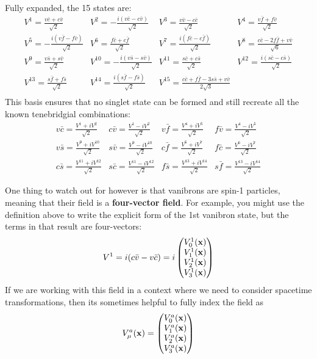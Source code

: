 Fully expanded, the 15 states are:
\[
  \begin{array}{cccc}
    V^1=\frac{v \bar{c}+c \bar{v}}{\sqrt{2}}                 & V^2=-\frac{i \left(v \bar{c}-c \bar{v}\right)}{\sqrt{2}}    & V^3=\frac{v \bar{v}-c \bar{c}}{\sqrt{2}}                            & V^4=\frac{v \bar{f}+f \bar{v}}{\sqrt{2}}                   \\
    V^5=-\frac{i \left(v \bar{f}-f \bar{v}\right)}{\sqrt{2}} & V^6=\frac{f \bar{c}+c \bar{f}}{\sqrt{2}}                    & V^7=\frac{i \left(f \bar{c}-c \bar{f}\right)}{\sqrt{2}}             & V^8=\frac{c \bar{c}-2 f \bar{f}+v \bar{v}}{\sqrt{6}}       \\
    V^9=\frac{v \bar{s}+s \bar{v}}{\sqrt{2}}                 & V^{10}=-\frac{i \left(v \bar{s}-s \bar{v}\right)}{\sqrt{2}} & V^{11}=\frac{s \bar{c}+c \bar{s}}{\sqrt{2}}                         & V^{12}=\frac{i \left(s \bar{c}-c \bar{s}\right)}{\sqrt{2}} \\
    V^{13}=\frac{s \bar{f}+f \bar{s}}{\sqrt{2}}              & V^{14}=\frac{i \left(s \bar{f}-f \bar{s}\right)}{\sqrt{2}}  & V^{15}=\frac{c \bar{c}+f \bar{f}-3 s \bar{s}+v \bar{v}}{2 \sqrt{3}} & \text{}                                                    \\
  \end{array}
\]
This basis ensures that no singlet state can be formed and still recreate all the known tenebridgial combinations:
\[
  \begin{array}{cccc}
    v\bar{c} = \frac{V^1+iV^2}{\sqrt{2}}
     & c\bar{v} = \frac{V^1-iV^2}{\sqrt{2}}
     & v\bar{f} = \frac{V^4+iV^5}{\sqrt{2}}
     & f\bar{v} = \frac{V^4-iV^5}{\sqrt{2}}       \\
    v\bar{s} = \frac{V^9+iV^{10}}{\sqrt{2}}
     & s\bar{v} = \frac{V^{9}-iV^{10}}{\sqrt{2}}
     & c\bar{f} = \frac{V^{6}+iV^{7}}{\sqrt{2}}
     & f\bar{c} = \frac{V^{6}-iV^{7}}{\sqrt{2}}   \\
    c\bar{s} = \frac{V^{11}+iV^{12}}{\sqrt{2}}
     & s\bar{c} = \frac{V^{11}-iV^{12}}{\sqrt{2}}
     & f\bar{s} = \frac{V^{13}+iV^{14}}{\sqrt{2}}
     & s\bar{f} = \frac{V^{13}-iV^{14}}{\sqrt{2}}
  \end{array}
\]

One thing to watch out for however is that vanibrons are spin-1 particles, meaning that their field is a \textbf{four-vector field}. For example, you might use the definition above to write the explicit form of the 1st vanibron state, but the terms in that result are four-vectors:
\[
  V^1 = i(c\bar{v}-v\bar{c}) = i\fourvec{%
    V^1_0(\mathbf{x})%
  }{
    V^1_1(\mathbf{x})
  }{
    V^1_2(\mathbf{x})
  }{
    V^1_3(\mathbf{x})
  }
\]
If we are working with this field in a context where we need to consider spacetime transformations, then its sometimes helpful to fully index the field as
\[
  V^a_{\mu}(\mathbf{x}) = \fourvec{%
    V^a_0(\mathbf{x})%
  }{
    V^a_1(\mathbf{x})
  }{
    V^a_2(\mathbf{x})
  }{
    V^a_3(\mathbf{x})
  }
\]


